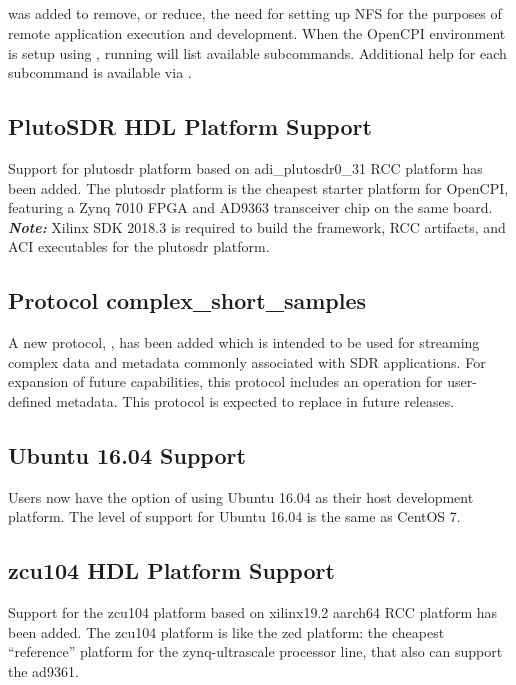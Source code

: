 \subsection{}
\label{sec:17_ocpiremote}
 was added to remove, or reduce, the need for setting up NFS for the purposes of remote application execution and development. When the OpenCPI environment is setup using , running  will list available subcommands. Additional help for each subcommand is available via .

\subsection{PlutoSDR HDL Platform Support}
\label{sec:17_plutosdr}
Support for plutosdr platform based on adi\_{}plutosdr0\_{}31 RCC platform has been added. The plutosdr platform is the cheapest starter platform for OpenCPI, featuring a Zynq 7010 FPGA and AD9363 transceiver chip on the same board.\\

\textit{\textbf{Note:}} Xilinx SDK 2018.3 is required to build the framework, RCC artifacts, and ACI executables for the plutosdr platform.

\subsection{Protocol complex\_{}short\_{}samples}
\label{sec:17_css}
A new protocol, , has been added which is intended to be used for streaming complex data and metadata commonly associated with SDR applications. For expansion of future capabilities, this protocol includes an operation for user-defined metadata. This protocol is expected to replace  in future releases.

\subsection{Ubuntu 16.04 Support}
\label{sec:17_ubuntu_16.04}
Users now have the option of using Ubuntu 16.04 as their host development platform. The level of support for Ubuntu 16.04 is the same as CentOS 7.

\subsection{zcu104 HDL Platform Support}
\label{sec:17_zcu104}
Support for the zcu104 platform based on xilinx19.2 aarch64 RCC platform has been added. The zcu104 platform is like the zed platform: the cheapest ``reference'' platform for the zynq-ultrascale processor line, that
also can support the ad9361.\\

